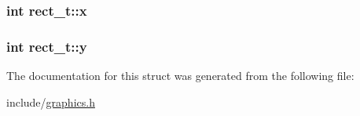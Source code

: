\subsubsection[{\texorpdfstring{x}{x}}]{\setlength{\rightskip}{0pt plus 5cm}int rect\+\_\+t\+::x}\hypertarget{structrect__t_aac9f3f28f20b5ed45f64fac971269dc3}{}\label{structrect__t_aac9f3f28f20b5ed45f64fac971269dc3}
\subsubsection[{\texorpdfstring{y}{y}}]{\setlength{\rightskip}{0pt plus 5cm}int rect\+\_\+t\+::y}\hypertarget{structrect__t_a0683ba02d080cdcaeacbf0ab28c73083}{}\label{structrect__t_a0683ba02d080cdcaeacbf0ab28c73083}


The documentation for this struct was generated from the following file\+:\begin{DoxyCompactItemize}
\item 
include/\hyperlink{graphics_8h}{graphics.\+h}\end{DoxyCompactItemize}

